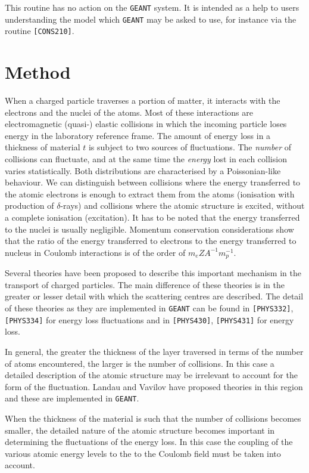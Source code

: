 This routine has no action on the {\tt GEANT} 
system. It is intended as a help to users understanding the
model which {\tt GEANT} may be asked to use, 
for instance via the routine  {\tt [CONS210]}.

\section{Method}
When a charged particle traverses a portion of matter, 
it interacts with the electrons
and the nuclei of the atoms. Most of 
these interactions are
electromagnetic (quasi-)
elastic collisions in which the incoming particle loses energy in the
laboratory reference frame. The amount of energy loss in a thickness of 
material
$t$ is subject to two sources of fluctuations. The {\it number} of
collisions can fluctuate, and at the same time the {\it energy} lost in each
collision varies statistically. Both distributions are characterised
by a Poissonian-like behaviour. We can distinguish between collisions
where the energy transferred to the atomic electrons is enough to 
extract them from the atoms (ionisation with production of $\delta$-rays)
and collisions where the atomic structure is excited, without a complete
ionisation (excitation). It has to be noted that the energy
transferred to the nuclei is usually negligible. Momentum conservation
considerations show that the ratio of the energy transferred to 
electrons to the energy transferred to nucleus in Coulomb interactions
is of the order of $m_{e}Z A^{-1}m_{p}^{-1}$.

Several theories have been proposed to describe
this important mechanism in the transport of charged particles.
The main difference of these theories is in the greater or lesser
detail with which the scattering centres are described. 
The detail of these theories as they are implemented in {\tt GEANT} can
be found in {\tt [PHYS332]}, {\tt [PHYS334]} for energy loss fluctuations
and in {\tt [PHYS430]}, {\tt [PHYS431]} for energy loss.

In general, the greater the thickness of the layer traversed
in terms of the number of atoms encountered, the larger
is the number of collisions. In this case a detailed description of
the atomic structure may be irrelevant to account for the form of the
fluctuation. Landau and Vavilov have proposed theories in this region
and these are implemented in {\tt GEANT}. 

When the thickness of the material is such that the number of collisions
becomes smaller, the detailed nature of the atomic structure becomes 
important in determining the fluctuations of the energy loss. In this
case the coupling of the various atomic energy levels to the to the
Coulomb field must be taken into account.

